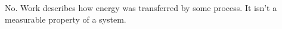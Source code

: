 No. Work describes how energy was transferred by some
process. It isn't a measurable property of a system.



